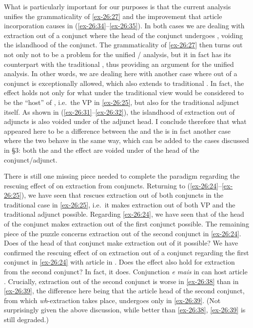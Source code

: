 \documentclass[output=paper]{langsci/langscibook}
\begin{document}
What is particularly important for our purposes is that the current analysis
unifies the grammaticality of \eqref{ex-26:27} and the improvement that article
incorporation causes in (\ref{ex-26:34}--\ref{ex-26:35}). In both cases we are dealing with
extraction out of a conjunct where the head of the conjunct undergoes ,
voiding the islandhood of the conjunct. The grammaticality of \eqref{ex-26:27} then turns
out not only not to be a problem for the unified / analysis,
but it in fact has its counterpart with the traditional , thus
providing an argument for the unified analysis. In other words, we are dealing
here with another case where  out of a conjunct is exceptionally
allowed, which also extends to traditional . In fact, the effect
holds not only for what under the traditional view would be considered to be
the \enquote{host} of , i.e.\ the VP in \eqref{ex-26:25}, but also for the
traditional adjunct itself.  As shown in (\ref{ex-26:31}--\ref{ex-26:32}), the islandhood
of extraction out of adjuncts is also voided under  of
the adjunct head. I conclude therefore that what appeared here to be a
difference between the  and the  is in fact another case where the two behave in the same way, which
can be added to the cases discussed in §3: both the  and the
 effect are voided under  of the head of the conjunct/adjunct.

There is still one missing piece needed to complete the paradigm regarding the
rescuing effect of  on extraction from conjuncts. Returning to
(\ref{ex-26:24}--\ref{ex-26:25}), we have seen that  rescues extraction out of both
conjuncts in the traditional  case in \eqref{ex-26:25}, i.e.\ it makes extraction
out of both VP and the traditional adjunct possible. Regarding \eqref{ex-26:24}, we have
seen that  of the head of the conjunct makes extraction out of the
first conjunct possible. The remaining piece of the puzzle concerns extraction
out of the second conjunct in \eqref{ex-26:24}. Does  of the head of that
conjunct make extraction out of it possible? We have confirmed the rescuing
effect of  on extraction out of a conjunct regarding the first
conjunct in \eqref{ex-26:24} with article  in . Does the effect also
hold for extraction from the second conjunct? In fact, it does. Conjunction
\emph{e mais} in  can host article . Crucially, extraction
out of the second conjunct is worse in \eqref{ex-26:38} than in \eqref{ex-26:39}, the difference here
being that the article head of the second conjunct, from which
\emph{wh}-extraction takes place, undergoes  only in \eqref{ex-26:39}. (Not
surprisingly given the above discussion, while better than \eqref{ex-26:38}, \eqref{ex-26:39} is still
degraded.)
\end{document}
